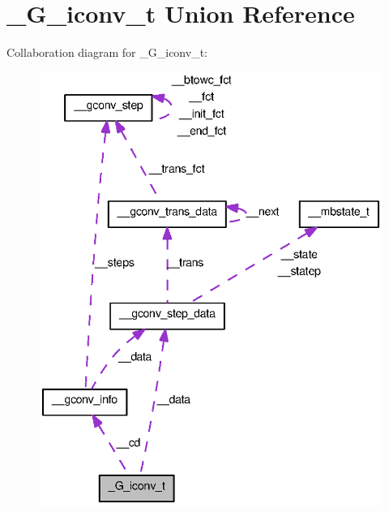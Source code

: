 \section{\_\-G\_\-iconv\_\-t Union Reference}
\label{union__G__iconv__t}


Collaboration diagram for \_\-G\_\-iconv\_\-t:
\nopagebreak
\begin{figure}[H]
\begin{center}
\leavevmode
\includegraphics[width=341pt]{union__G__iconv__t__coll__graph}
\end{center}
\end{figure}
